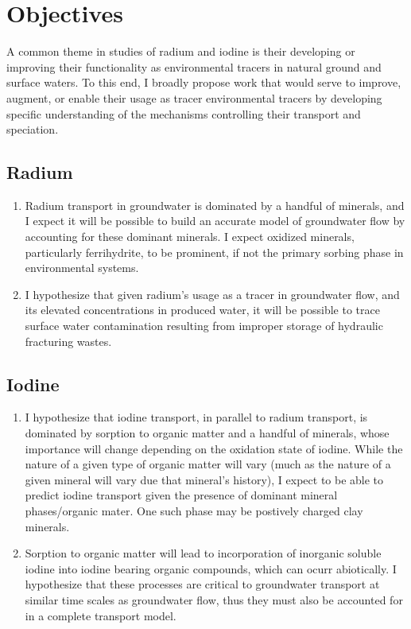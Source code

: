 \documentclass[twoside,12pt,titlepage]{article}
\begin{document}
\section{Objectives}

A common theme in studies of radium and iodine is their developing or improving their functionality as environmental tracers in natural ground and surface waters. To this end, I broadly propose work that would serve to improve, augment, or enable their usage as tracer environmental tracers by developing specific understanding of the mechanisms controlling their transport and speciation.
\subsection{Radium}

\begin{enumerate}[label=\arabic*)]
	\item Radium transport in groundwater is dominated by a handful of minerals, and I expect it will be possible to build an accurate model of groundwater flow by accounting for these dominant minerals. I expect oxidized minerals, particularly ferrihydrite, to be prominent, if not the primary sorbing phase in environmental systems.
	\item I hypothesize that given radium's usage as a tracer in groundwater flow, and its elevated concentrations in produced water, it will be possible to trace surface water contamination resulting from improper storage of hydraulic fracturing wastes.
\end{enumerate}

\subsection{Iodine}

\begin{enumerate}[label = \arabic*)]
	\item I hypothesize that iodine transport, in parallel to radium transport, is dominated by sorption to organic matter and a handful of minerals, whose importance will change depending on the oxidation state of iodine. While the nature of a given type of organic matter will vary (much as the nature of a given mineral will vary due that mineral's history), I expect to be able to predict iodine transport given the presence of dominant mineral phases/organic mater. One such phase may be postively charged clay minerals.
	\item Sorption to organic matter will lead to incorporation of inorganic soluble iodine into iodine bearing organic compounds, which can ocurr abiotically. I hypothesize that these processes are critical to groundwater transport at similar time scales as groundwater flow, thus they must also be accounted for in a complete transport model.
\end{enumerate}
\end{document}

